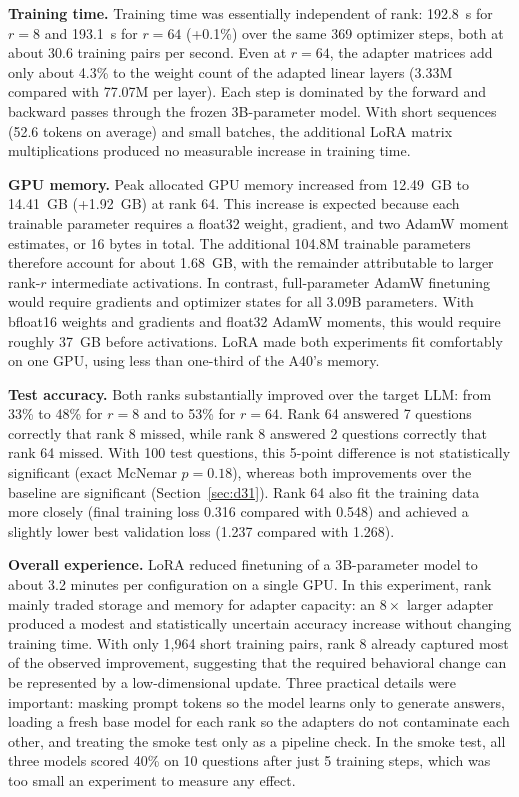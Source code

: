 \documentclass[11pt]{article}
\begin{document}
\textbf{Training time.} Training time was essentially independent of rank: 192.8~s for $r = 8$ and 193.1~s for $r = 64$ (+0.1\%) over the same 369 optimizer steps, both at about 30.6 training pairs per second. Even at $r = 64$, the adapter matrices add only about 4.3\% to the weight count of the adapted linear layers (3.33M compared with 77.07M per layer). Each step is dominated by the forward and backward passes through the frozen 3B-parameter model. With short sequences (52.6 tokens on average) and small batches, the additional LoRA matrix multiplications produced no measurable increase in training time.

\textbf{GPU memory.} Peak allocated GPU memory increased from 12.49~GB to 14.41~GB (+1.92~GB) at rank 64. This increase is expected because each trainable parameter requires a float32 weight, gradient, and two AdamW moment estimates, or 16 bytes in total. The additional 104.8M trainable parameters therefore account for about 1.68~GB, with the remainder attributable to larger rank-$r$ intermediate activations. In contrast, full-parameter AdamW finetuning would require gradients and optimizer states for all 3.09B parameters. With bfloat16 weights and gradients and float32 AdamW moments, this would require roughly 37~GB before activations. LoRA made both experiments fit comfortably on one GPU, using less than one-third of the A40's memory.

\textbf{Test accuracy.} Both ranks substantially improved over the target LLM: from 33\% to 48\% for $r = 8$ and to 53\% for $r = 64$. Rank 64 answered 7 questions correctly that rank 8 missed, while rank 8 answered 2 questions correctly that rank 64 missed. With 100 test questions, this 5-point difference is not statistically significant (exact McNemar $p = 0.18$), whereas both improvements over the baseline are significant (Section~\ref{sec:d31}). Rank 64 also fit the training data more closely (final training loss 0.316 compared with 0.548) and achieved a slightly lower best validation loss (1.237 compared with 1.268).

\textbf{Overall experience.} LoRA reduced finetuning of a 3B-parameter model to about 3.2 minutes per configuration on a single GPU. In this experiment, rank mainly traded storage and memory for adapter capacity: an $8\times$ larger adapter produced a modest and statistically uncertain accuracy increase without changing training time. With only 1,964 short training pairs, rank 8 already captured most of the observed improvement, suggesting that the required behavioral change can be represented by a low-dimensional update. Three practical details were important: masking prompt tokens so the model learns only to generate answers, loading a fresh base model for each rank so the adapters do not contaminate each other, and treating the smoke test only as a pipeline check. In the smoke test, all three models scored 40\% on 10 questions after just 5 training steps, which was too small an experiment to measure any effect.
\end{document}
